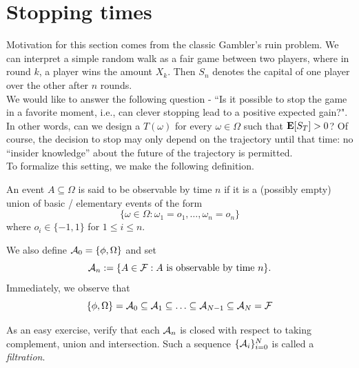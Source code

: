 \documentclass[main]{subfiles}
\begin{document}
\begin{obs}
\begin{enumerate}

    \end{enumerate}
\end{obs}

\section{Stopping times}

Motivation for this section comes from the classic Gambler's ruin problem. We can interpret a simple random walk as a fair game between two players, where in round $ k $, a player wins the amount $ X_k $. Then $ S_n $ denotes the capital of one player over the other after $ n $ rounds.\\

We would like to answer the following question - ``Is it possible to stop the game in a favorite moment, i.e., can clever stopping lead to a positive expected gain?". In other words, can we design a $ T(\omega) $ for every $ \omega\in\Omega $ such that $ \mathbf E[S_T] > 0 $? Of course, the decision to stop may only depend on the trajectory until that time: no ``insider knowledge” about the future of the trajectory is permitted.\\

To formalize this setting, we make the following definition.\\

\begin{definition}
    An event $ A\subseteq\Omega $ is said to be observable by time $ n $ if it is a (possibly empty) union of basic / elementary events of the form \[\{\omega\in\Omega:\omega_1=o_1,\ldots,\omega_n=o_n\}\] where $ o_i\in\{-1,1\} $ for $ 1\le i\le n $.
\end{definition}

We also define $ \mathcal A_0=\{\phi, \Omega\} $ and set \[\mathcal A_n:=\{A\in\mathcal F:A \text{ is observable by time }n\}.\]
Immediately, we observe that \[\{\phi, \Omega\}=\mathcal A_0\subseteq\mathcal A_1\subseteq\ldots\subseteq\mathcal A_{N-1}\subseteq\mathcal A_N=\mathcal F \]

As an easy exercise, verify that each $ \mathcal A_n $ is closed with respect to taking complement, union and intersection. Such a sequence $ \{\mathcal A_i\}_{i=0}^N $ is called a \textit{filtration}.
\end{document}
